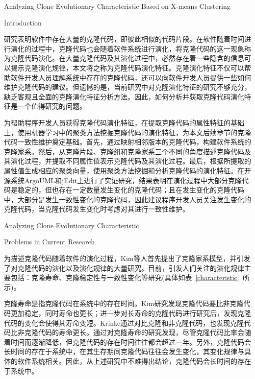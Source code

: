 
{Analyzing Clone Evolutionary Characteristic Based on X-means Clustering}

{Introduction}

研究表明软件中存在大量的克隆代码，即彼此相似的代码片段。在软件随着时间进行演化的过程中，克隆代码也会随着软件系统进行演化，将克隆代码的这一现象称为克隆代码演化。在大量克隆代码及其演化过程中，必然存在着一些隐含的信息可以揭示克隆演化规律，本文将之称为克隆代码演化特征。克隆演化特征不仅可以帮助软件开发人员理解系统中存在的克隆代码，还可以向软件开发人员提供一些如何维护克隆代码的建议。但遗憾的是，当前研究中对克隆演化特征的研究不够充分，缺乏客观且全面的克隆演化特征分析方法。因此，如何分析并获取克隆代码演化特征是一个值得研究的问题。

为帮助程序开发人员获得克隆代码演化特征，在提取克隆代码的属性特征的基础上，使用机器学习中的聚类方法挖掘克隆代码的演化特征，为本文后续章节的克隆代码一致性维护奠定基础。首先，通过映射相邻版本的克隆代码，构建软件系统的克隆家系。然后，从克隆片段、克隆组和克隆家系三个不同的角度描述克隆代码及其演化过程，并提取不同属性值表示克隆代码及其演化过程。最后，根据所提取的属性值生成相应的聚类向量，使用聚类方法挖掘和分析克隆代码的演化特征。在开源系统ArgoUML和jEdit上进行了实证研究，结果表明在演化过程中大部分克隆代码是稳定的，但也存在一定数量发生变化的克隆代码；且在发生变化的克隆代码中，大部分是发生一致性变化的克隆代码，因此建议程序开发人员关注发生变化的克隆代码，当克隆代码发生变化时考虑对其进行一致性维护。

{Analyzing Clone Evolutionary Characteristic}

{Problems in Current Research}

为描述克隆代码随着软件的演化过程，Kim等人首先提出了克隆家系模型\cite{kim2005empirical}，并引发了对克隆代码的演化以及演化规律的大量研究。目前，引发人们关注的演化规律主要包括：克隆寿命、克隆稳定性与一致性变化等研究(具体如表~\ref{characteristic}~所示)。

克隆寿命是指克隆代码在系统中的存在时间。Kim研究发现克隆代码要比非克隆代码更加稳定，同时寿命也更长\cite{kim2005empirical}；进一步对长寿命的克隆代码进行研究后，发现克隆代码的变化会使得其寿命变短\cite{cai2011empirical}。Krinke通过对比克隆和非克隆代码，也发现克隆代码比非克隆代码的寿命更长\cite{krinke2011cloned}。通过对克隆寿命的研究发现，尽管克隆代码比率会随着时间而逐渐降低，但克隆代码的存在时间往往都会超过一年\cite{bazrafshan2012evolution}。另外，克隆代码会长时间的存在于系统中，在其生存期间克隆代码往往会发生变化，其变化规律与具体的软件系统相关\cite{gode2009evolution}。因此，从上述研究中不难得出结论，克隆代码会长时间的存在于系统中。

